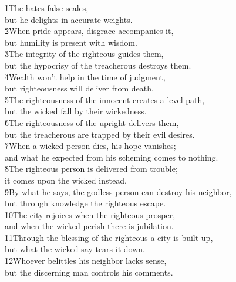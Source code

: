 \begin{poetry}
\poeml {}
\v{1}The  hates false scales, \\
\poeml but he delights in accurate weights. \\
\poeml \v{2}When pride appears, disgrace accompanies it, \\
\poemll    but humility is present with wisdom. \\
\poeml \v{3}The integrity of the righteous guides them, \\
\poemll    but the hypocrisy of the treacherous destroys them. \\
\poeml \v{4}Wealth won't help in the time of judgment, \\
\poemll    but righteousness will deliver from death. \\
\poeml \v{5}The righteousness of the innocent creates a level path, \\
\poemll    but the wicked fall by their wickedness. \\
\poeml \v{6}The righteousness of the upright delivers them, \\
\poemll    but the treacherous are trapped by their evil desires. \\
\poeml \v{7}When a wicked person dies, his hope vanishes; \\
\poemll    and what he expected from his scheming comes to nothing. \\
\poeml \v{8}The righteous person is delivered from trouble; \\
\poemll    it comes upon the wicked instead. \\
\poeml \v{9}By what he says, the godless person can destroy his neighbor, \\
\poemll    but through knowledge the righteous escape. \\
\poeml \v{10}The city rejoices when the righteous prosper, \\
\poemll    and when the wicked perish there is jubilation. \\
\poeml \v{11}Through the blessing of the righteous a city is built up, \\
\poemll    but what the wicked say tears it down. \\
\poeml \v{12}Whoever belittles his neighbor lacks sense, \\
\poemll    but the discerning man controls his comments. \\

\end{poetry}
